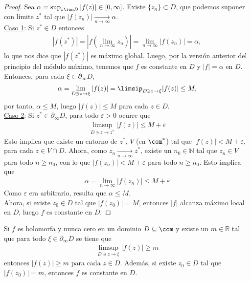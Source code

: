 \begin{proof}
Sea $\alpha = \sup_{z \ion D} |f(z)| \in [0,\infty]$. Existe $\{z_n\} \subset D$, que podemos suponer con límite $z^*$ tal que $|f(z_n)| \xrightarrow[n \to \infty]{} \alpha$.
\\
\newline
\underline{Caso 1}: Si $z^* \in D$ entonces
\begin{align*}
    |f(z^*)| = \left| f\left( \lim_{n \to \infty}{z_n}\right) \right| = \lim_{n \to \infty} |f(z_n)| = \alpha,
\end{align*}
lo que nos dice que $|f(z^*)|$ es máximo global. Luego, por la versión anterior del principio del módulo máximo, tenemos que $f$ es constante en $D$ y $|f| = \alpha$ en $D$. Entonces, para cada $\xi \in \partial_{\infty} D$,
\begin{align*}
    \alpha = \lim_{D \ni z \to \xi} |f(z)| = \limsip_{D \ni z \to \xi} |f(z)| \leq M,
\end{align*}
por tanto, $\alpha \leq M$, luego $|f(z)| \leq M$ para cada $z\in D$.
\\
\newline
\underline{Caso 2}: Si $z^* \in \partial_{\infty} D$, para todo $\varepsilon > 0$ ocurre que
\begin{align*}
    \limsup_{D \ni z \to z^*}|f(z)| \leq M + \varepsilon
\end{align*}
Esto implica que existe un entorno de $z^*$, $V$ (en $\com^*$) tal que $|f(z)| < M + \varepsilon$, para cada $z \in V \cap D$. Ahora, como $z_n \xrightarrow[n \to \infty]{} z^*$, existe un $n_0 \in \mathbb{N}$ tal que $z_n \in V$ para todo $n \ge n_0$, con lo que $|f(z_n)| < M + \varepsilon$ para todo $n \ge n_0$. Esto implica que
\begin{align*}
    \alpha = \lim_{n \to \infty} |f(z_n)| \leq M + \varepsilon
\end{align*}
Como $\varepsilon$ era arbitrario, resulta que $\alpha \leq M$. 
\\
\newline
Ahora, si existe $z_0 \in D$ tal que $|f(z_0)| = M$, entonces $|f|$ alcanza máximo local en $D$, luego $f$ es constante en $D$.
\end{proof}

\begin{teo}
Si $f$ es holomorfa y nunca cero en un dominio $D \subseteq \com$ y existe un $m \in \mathbb{R}$ tal que para todo $\xi \in \partial_{\infty} D$ se tiene que
\begin{align*}
    \limsup_{D \ni z \to \xi} |f(z)| \ge m
\end{align*}
entonces $|f(z)| \ge m$ para cada $z \in D$. Además, si existe $z_0 \in D$ tal que $|f(z_0)| = m$, entonces $f$ es constante en $D$.
\end{teo}

